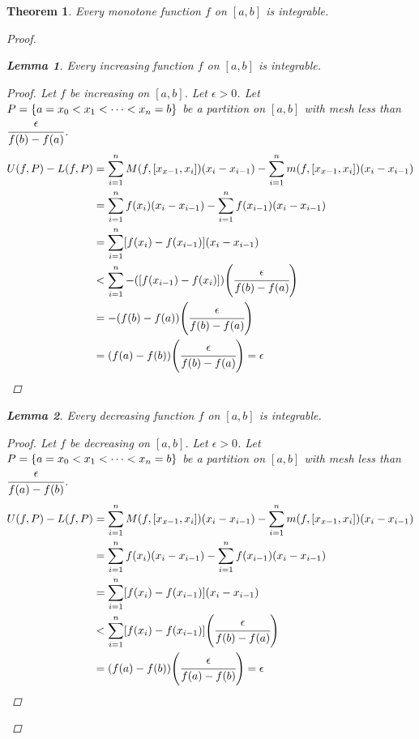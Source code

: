 \documentclass[]{article}
\newtheorem{theorem}{Theorem}
\newtheorem{lemma}{Lemma}
\begin{document}
\begin{theorem}
    Every monotone function $f$ on $[a,b]$ is integrable.
    \begin{proof}
        \begin{lemma}
            Every increasing function $f$ on $[a,b]$ is integrable.
            \begin{proof}
                Let $f$ be increasing on $[a,b]$.
                Let $\epsilon>0$.
                Let $P = \qty{a=x_0<x_1<\dots<x_n=b}$ be a partition on $[a,b]$ with mesh less than $\cfrac{\epsilon}{f(b)-f(a)}$.
                \begin{align*}
                    U(f,P) - L(f,P) 
                        &= \sum_{i=1}^n M(f,[x_{x-1},x_{i}])(x_{i}-x_{i-1}) 
                            - \sum_{i=1}^n m(f,[x_{x-1},x_{i}])(x_{i}-x_{i-1})\\
                        &= \sum_{i=1}^n f(x_i) (x_{i}-x_{i-1}) 
                            - \sum_{i=1}^n f(x_{i-1}) (x_{i}-x_{i-1})\\
                        &= \sum_{i=1}^n [f(x_i) - f(x_{i-1})] (x_{i}-x_{i-1})\\
                        &< \sum_{i=1}^n -\qty([f(x_{i-1}) - f(x_{i})]) \qty(\cfrac{\epsilon}{f(b)-f(a)})\\
                        &= -\qty(f(b) - f(a)) \qty(\cfrac{\epsilon}{f(b)-f(a)})\\
                        &= \qty(f(a) - f(b)) \qty(\cfrac{\epsilon}{f(b)-f(a)}) = \epsilon
                \end{align*}
            \end{proof}
        \end{lemma}
        \begin{lemma}
            Every decreasing function $f$ on $[a,b]$ is integrable.
            \begin{proof}
                Let $f$ be decreasing on $[a,b]$.
                Let $\epsilon>0$.
                Let $P = \qty{a=x_0<x_1<\dots<x_n=b}$ be a partition on $[a,b]$ with mesh less than $\cfrac{\epsilon}{f(a)-f(b)}$.
                \begin{align*}
                    U(f,P) - L(f,P) 
                        &= \sum_{i=1}^n M(f,[x_{x-1},x_{i}])(x_{i}-x_{i-1}) 
                            - \sum_{i=1}^n m(f,[x_{x-1},x_{i}])(x_{i}-x_{i-1})\\
                        &= \sum_{i=1}^n f(x_i) (x_{i}-x_{i-1}) 
                            - \sum_{i=1}^n f(x_{i-1}) (x_{i}-x_{i-1})\\
                        &= \sum_{i=1}^n [f(x_i) - f(x_{i-1})] (x_{i}-x_{i-1})\\
                        &< \sum_{i=1}^n [f(x_i) - f(x_{i-1})] \qty(\cfrac{\epsilon}{f(b)-f(a)})\\
                        &= \qty(f(a) - f(b)) \qty(\cfrac{\epsilon}{f(a)-f(b)}) = \epsilon
                \end{align*}
            \end{proof}
        \end{lemma}
    \end{proof}
\end{theorem}
\end{document}
